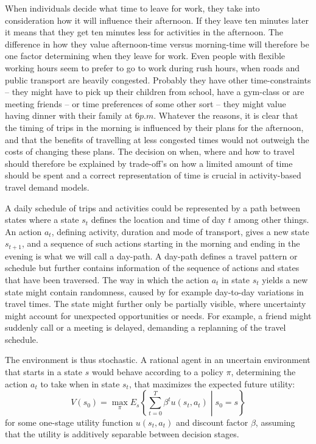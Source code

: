 
When individuals decide what time to leave for work, they take into consideration how it will influence their afternoon. If they leave ten minutes later it means that they get ten minutes less for activities in the afternoon. The difference in how they value afternoon-time versus morning-time will therefore be one factor determining when they leave for work. Even people with flexible working hours seem to prefer to go to work during rush hours, when roads and public transport are heavily congested. Probably they have other time-constraints -- they might have to pick up their children from school, have a gym-class or are meeting friends -- or time preferences of some other sort -- they might value having dinner with their family at $6\unit{p.m}$. Whatever the reasons, it is clear that the timing of trips in the morning is influenced by their plans for the afternoon, and that the benefits of travelling at less congested times would not outweigh the costs of changing these plans. The decision on when, where and how to travel should therefore be explained by trade-off's on how a limited amount of time should be spent and a correct representation of time is crucial in activity-based travel demand models. 

A daily schedule of trips and activities could be represented by a path between states where a state $s_t$ defines the location and time of day $t$ among other things. An action $a_t$, defining activity, duration and mode of transport, gives a new state $s_{t+1}$, and a sequence of such actions starting in the morning and ending in the evening is what we will call a day-path. A day-path defines a travel pattern or schedule but further contains information of the sequence of actions and states that have been traversed. The way in which the action $a_t$ in state $s_t$ yields a new state might contain randomness, caused by for example day-to-day variations in travel times. The state might further only be partially visible, where uncertainty might account for unexpected opportunities or needs. For example, a friend might suddenly call or a meeting is delayed, demanding a replanning of the travel schedule. 

The environment is thus stochastic. A rational agent in an uncertain environment that starts in a state $s$ would behave according to a policy $\pi$, determining the action $a_t$ to take when in state $s_t$, that maximizes the expected future utility:
\begin{equation}\label{eq:vf}
V(s_0) = \max_{\pi} E_s \left\{ \sum_{t=0}^T \beta^{t} u(s_t,a_t)\middle | s_0 = s \right\}
\end{equation}
for some one-stage utility function $u(s_t,a_t)$ and discount factor $\beta$, assuming that the utility is additively separable between decision stages. 

